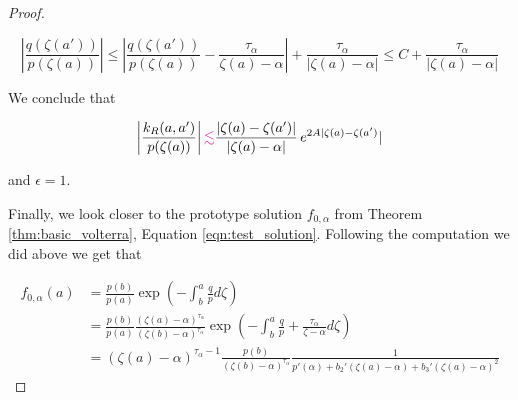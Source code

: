 \documentclass{article}
\theoremstyle{plain}
\newcommand{\volterra}{\mathcal{V}}
\newcommand{\hardpart}{\mathcal{V}_0}
\newcommand{\softpart}{\mathcal{V}_\star}
\begin{document}
\begin{proof}
\begin{enumerate}
\[    \left\vert \frac{q(\zeta(a'))}{p(\zeta(a))}\right\vert  \leq \left\vert \frac{q(\zeta(a'))}{p(\zeta(a))} -\frac{\tau_\alpha}{\zeta(a)-\alpha}\right\vert + \frac{\tau_\alpha}{|\zeta(a)-\alpha|}\leq C +  \frac{\tau_\alpha}{|\zeta(a)-\alpha|} \]

We conclude that 

\[\left\vert \frac{k_R(a,a')}{p(\zeta(a))}\right\vert\textcolor{magenta}{\lesssim} \frac{|\zeta(a)-\zeta(a')|}{|\zeta(a)-\alpha|}\, e^{2A |\zeta(a)-\zeta(a')} | \]

and $\epsilon=1$.

\end{enumerate}

Finally, we look closer to the prototype solution $f_{0,\alpha}$ from Theorem \ref{thm:basic_volterra}, Equation \eqref{eqn:test_solution}. Following the computation we did above we get that 

\begin{align*}
    f_{0,\alpha}(a)&=\frac{p(b)}{p(a)} \exp\left(-\int_b^a\frac{q}{p} d\zeta\right)\\
    &=\frac{p(b)}{p(a)} \frac{(\zeta(a)-\alpha)^{\tau_\alpha}}{(\zeta(b)-\alpha)^{\tau_\alpha}} \exp\left(-\int_b^a\frac{q}{p}+\frac{\tau_\alpha}{\zeta-\alpha} d\zeta\right)\\
    &=(\zeta(a)-\alpha)^{\tau_\alpha-1} \frac{p(b)}{(\zeta(b)-\alpha)^{\tau_\alpha}} \frac{1}{p'(\alpha)+b_2'(\zeta(a)-\alpha)+b_3'(\zeta(a)-\alpha)^2}
\end{align*}

\end{proof}





\end{document}
